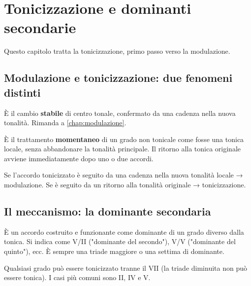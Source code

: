 \chapter{Tonicizzazione e dominanti secondarie}
\label{chap:tonicizzazione}

Questo capitolo tratta la tonicizzazione, primo passo verso la modulazione.

\section{Modulazione e tonicizzazione: due fenomeni distinti}
\label{sec:mod_vs_ton}

\begin{definizione}[Modulazione]
    È il cambio \textbf{stabile} di centro tonale, confermato da una cadenza nella nuova tonalità. Rimanda a \ref{chap:modulazione}.
\end{definizione}

\begin{definizione}[Tonicizzazione]
    È il trattamento \textbf{momentaneo} di un grado non tonicale come fosse una tonica locale, senza abbandonare la tonalità principale. Il ritorno alla tonica originale avviene immediatamente dopo uno o due accordi.
\end{definizione}

\begin{regola}
    Se l'accordo tonicizzato è seguito da una cadenza nella nuova tonalità locale → modulazione. Se è seguito da un ritorno alla tonalità originale → tonicizzazione.
\end{regola}

\section{Il meccanismo: la dominante secondaria}
\label{sec:meccanismo_dominante}

\begin{definizione}
    È un accordo costruito e funzionante come dominante di un grado diverso dalla tonica. Si indica come V/II ("dominante del secondo"), V/V ("dominante del quinto"), ecc. È sempre una triade maggiore o una settima di dominante.
\end{definizione}

\begin{regola}
    Qualsiasi grado può essere tonicizzato tranne il VII (la triade diminuita non può essere tonica). I casi più comuni sono II, IV e V.
\end{regola}

